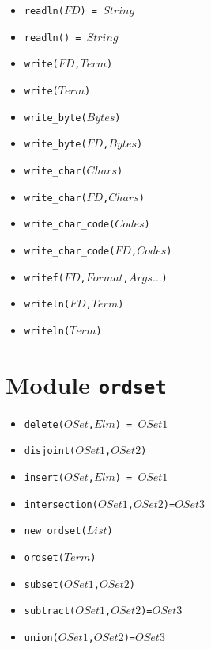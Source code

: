 \documentclass[10pt]{article}
\begin{document}
\begin{multicols}{2}
\begin{scriptsize}
\begin{itemize}
   \item \texttt{readln($FD$) = $String$}
   \item \texttt{readln() = $String$}
   \item \texttt{write($FD$,$Term$)}
   \item \texttt{write($Term$)}
   \item \texttt{write\_byte($Bytes$)}
   \item \texttt{write\_byte($FD$,$Bytes$)}
   \item \texttt{write\_char($Chars$)}
   \item \texttt{write\_char($FD$,$Chars$)}
   \item \texttt{write\_char\_code($Codes$)}
   \item \texttt{write\_char\_code($FD$,$Codes$)}
   \item \texttt{writef($FD$,$Format$,$Args\ldots$)}
   \item \texttt{writeln($FD$,$Term$)}
   \item \texttt{writeln($Term$)}
\end{itemize}
\end{scriptsize}
\section*{Module \texttt{ordset}}
\begin{scriptsize}
\begin{itemize}
\item \texttt{delete($OSet$,$Elm$) = $OSet1$}
\item \texttt{disjoint($OSet1$,$OSet2$)}
\item \texttt{insert($OSet$,$Elm$) = $OSet1$}
\item \texttt{intersection($OSet1$,$OSet2$)=$OSet3$}
\item \texttt{new\_ordset($List$)}
\item \texttt{ordset($Term$)}
\item \texttt{subset($OSet1$,$OSet2$)}
\item \texttt{subtract($OSet1$,$OSet2$)=$OSet3$}
\item \texttt{union($OSet1$,$OSet2$)=$OSet3$}
\end{itemize}
\end{scriptsize}

\end{multicols}
\end{document}

